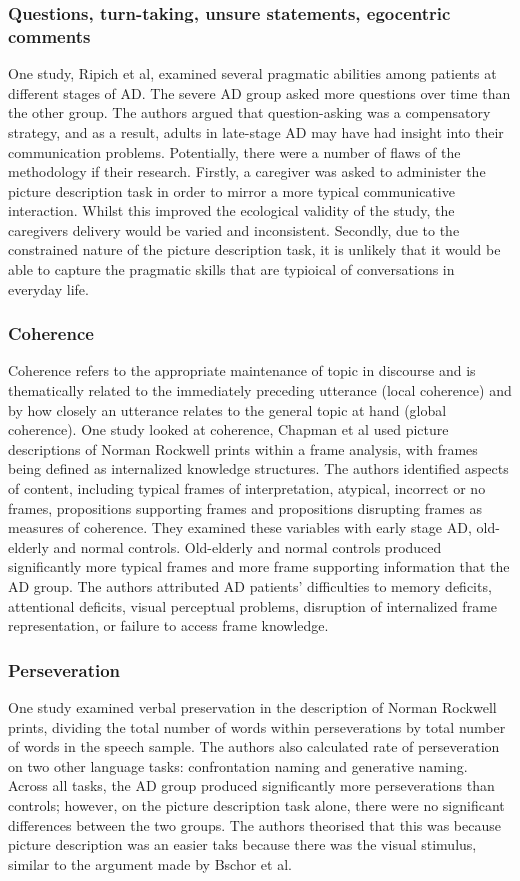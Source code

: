 \documentclass{article}
\begin{document}
\subsubsection{Questions, turn-taking, unsure statements, egocentric comments}
One study, Ripich et al, examined several pragmatic abilities among patients at different stages of AD. The severe AD group asked more questions over time than the other group. The authors argued that question-asking was a compensatory strategy, and as a result, adults in late-stage AD may have had insight into their communication problems. Potentially, there were a number of flaws of the methodology if their research. Firstly, a caregiver was asked to administer the picture description task in order to mirror a more typical communicative interaction. Whilst this improved the ecological validity of the study, the caregivers delivery would be varied and inconsistent. Secondly, due to the constrained nature of the picture description task, it is unlikely that it would be able to capture the pragmatic skills that are typioical of conversations in everyday life.
\par
\subsubsection{Coherence}
Coherence refers to the appropriate maintenance of topic in discourse and is thematically related to the immediately preceding utterance (local coherence) and by how closely an utterance relates to the general topic at hand (global coherence). One study looked at coherence, Chapman et al used picture descriptions of Norman Rockwell prints within a frame analysis, with frames being defined as internalized knowledge structures. The authors identified aspects of content, including typical frames of interpretation, atypical, incorrect or no frames, propositions supporting frames and propositions disrupting frames as measures of coherence. They examined these variables with early stage AD, old-elderly and normal controls. Old-elderly and normal controls produced significantly more typical frames and more frame supporting information that the AD group. The authors attributed AD patients' difficulties to memory deficits, attentional deficits, visual perceptual problems, disruption of internalized frame representation, or failure to access frame knowledge.
\par
\subsubsection{Perseveration}
One study examined verbal preservation in the description of Norman Rockwell prints, dividing the total number of words within perseverations by total number of words in the speech sample. The authors also calculated rate of perseveration on two other language tasks: confrontation naming and generative naming. Across all tasks, the AD group produced significantly more perseverations than controls; however, on the picture description task alone, there were no significant differences between the two groups. The authors theorised that this was because picture description was an easier taks because there was the visual stimulus, similar to the argument made by Bschor et al.
\par
\end{document}
